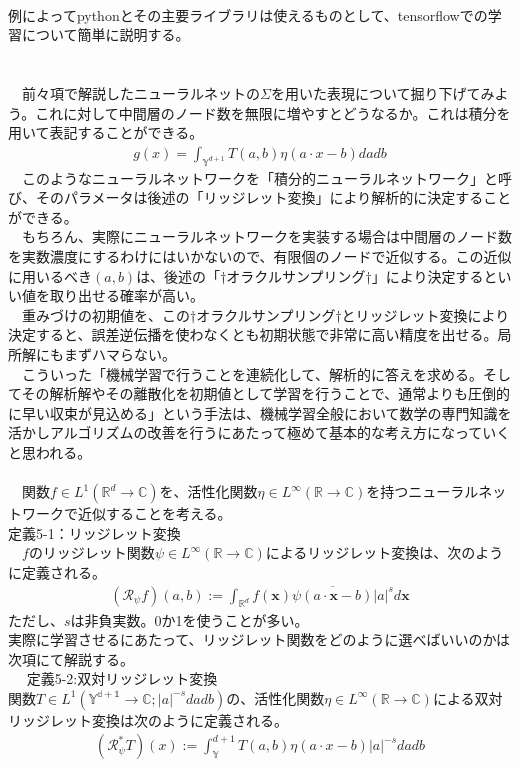 \documentclass{jsarticle}
\begin{document}
\scalebox{1.1}{2.学習の実装について}\\
例によってpythonとその主要ライブラリは使えるものとして、tensorflowでの学習について簡単に説明する。\\
　\\


\scalebox{1.1}{3.ニューラルネットワークの積分表現理論}\\
　前々項で解説したニューラルネットの$\Sigma$を用いた表現について掘り下げてみよう。これに対して中間層のノード数を無限に増やすとどうなるか。これは積分を用いて表記することができる。
\begin{eqnarray}
g(x)=\int_{\mathbb{Y}^{d+1}}T(a,b)\eta(a\cdot x-b)dadb
\end{eqnarray}
　このようなニューラルネットワークを「積分的ニューラルネットワーク」と呼び、そのパラメータは後述の「リッジレット変換」により解析的に決定することができる。\\
　もちろん、実際にニューラルネットワークを実装する場合は中間層のノード数を実数濃度にするわけにはいかないので、有限個のノードで近似する。この近似に用いるべき$(a,b)$は、後述の「$\dag$オラクルサンプリング$\dag$」により決定するといい値を取り出せる確率が高い。\\
　重みづけの初期値を、この$\dag$オラクルサンプリング$\dag$とリッジレット変換により決定すると、誤差逆伝播を使わなくとも初期状態で非常に高い精度を出せる。局所解にもまずハマらない。\\
　こういった「機械学習で行うことを連続化して、解析的に答えを求める。そしてその解析解やその離散化を初期値として学習を行うことで、通常よりも圧倒的に早い収束が見込める」という手法は、機械学習全般において数学の専門知識を活かしアルゴリズムの改善を行うにあたって極めて基本的な考え方になっていくと思われる。\\
　\\
　関数$f\in L^1(\mathbb{R}^d\rightarrow \mathbb{C})$を、活性化関数$\eta\in L^\infty(\mathbb{R}\rightarrow\mathbb{C})$を持つニューラルネットワークで近似することを考える。\\
定義5-1：リッジレット変換\\
　$f$のリッジレット関数$\psi\in L^\infty(\mathbb{R}\rightarrow\mathbb{C})$によるリッジレット変換は、次のように定義される。
\begin{eqnarray}
(\mathcal{R}_\psi f)(a,b):=\int_{\mathbb{R}^{d}}f(\bm{x})\overline{\psi(a\cdot\bm{x}-b)}|a|^sd\bm{x}
\end{eqnarray}
ただし、$s$は非負実数。0か1を使うことが多い。\\
実際に学習させるにあたって、リッジレット関数をどのように選べばいいのかは次項にて解説する。\\
　
定義5-2:双対リッジレット変換\\
関数$T\in L^1(\mathbb{{Y}^{d+1}}\rightarrow\mathbb{C};|a|^{-s}dadb)$の、活性化関数$\eta\in L^\infty(\mathbb{R}\rightarrow\mathbb{C})$による双対リッジレット変換は次のように定義される。
\begin{eqnarray}
(\mathcal{R}^*_\psi T)(x):=\int_\mathbb{Y}^{d+1}T(a,b)\eta(a\cdot x-b)|a|^{-s}dadb
\end{eqnarray}
\end{document}
